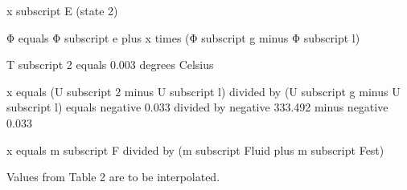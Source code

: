x subscript E (state 2)  

Φ equals Φ subscript e plus x times (Φ subscript g minus Φ subscript l)  

T subscript 2 equals 0.003 degrees Celsius  

x equals (U subscript 2 minus U subscript l) divided by (U subscript g minus U subscript l) equals negative 0.033 divided by negative 333.492 minus negative 0.033  

x equals m subscript F divided by (m subscript Fluid plus m subscript Fest)  

Values from Table 2 are to be interpolated.